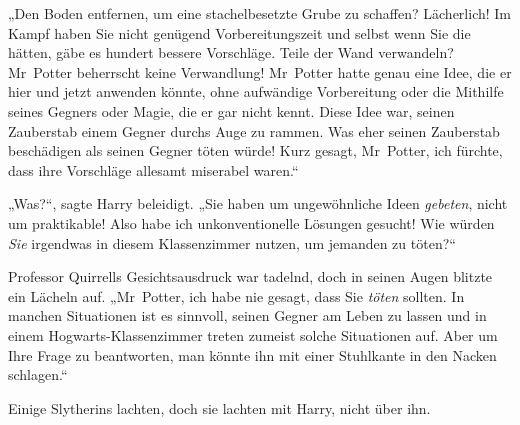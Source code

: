 „Den Boden entfernen, um eine stachelbesetzte Grube zu schaffen? Lächerlich! Im Kampf haben Sie nicht genügend Vorbereitungszeit und selbst wenn Sie die hätten, gäbe es hundert bessere Vorschläge. Teile der Wand verwandeln? Mr~Potter beherrscht keine Verwandlung! Mr~Potter hatte genau eine Idee, die er hier und jetzt anwenden könnte, ohne aufwändige Vorbereitung oder die Mithilfe seines Gegners oder Magie, die er gar nicht kennt. Diese Idee war, seinen Zauberstab einem Gegner durchs Auge zu rammen. Was eher seinen Zauberstab beschädigen als seinen Gegner töten würde! Kurz gesagt, Mr~Potter, ich fürchte, dass ihre Vorschläge allesamt miserabel waren.“

„Was?“, sagte Harry beleidigt.
„Sie haben um ungewöhnliche Ideen \emph{gebeten}, nicht um praktikable! Also habe ich unkonventionelle Lösungen gesucht! Wie würden \emph{Sie} irgendwas in diesem Klassenzimmer nutzen, um jemanden zu töten?“

Professor Quirrells Gesichtsausdruck war tadelnd, doch in seinen Augen blitzte ein Lächeln auf.
„Mr~Potter, ich habe nie gesagt, dass Sie \emph{töten} sollten. In manchen Situationen ist es sinnvoll, seinen Gegner am Leben zu lassen und in einem Hogwarts-Klassenzimmer treten zumeist solche Situationen auf. Aber um Ihre Frage zu beantworten, man könnte ihn mit einer Stuhlkante in den Nacken schlagen.“

Einige Slytherins lachten, doch sie lachten mit Harry, nicht über ihn.

